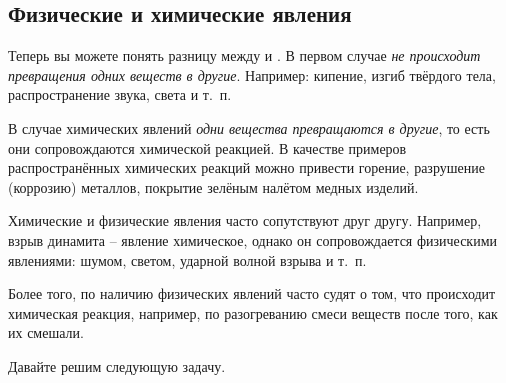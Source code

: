 \subsection*{Физические и химические явления}

Теперь вы можете понять разницу между  и . В первом случае \emph{не происходит превращения одних веществ в другие}. Например: кипение, изгиб твёрдого тела, распространение звука, света и т.~п.

В случае химических явлений \emph{одни вещества превращаются в другие}, то есть они сопровождаются химической реакцией. В качестве примеров распространённых химических реакций можно привести горение, разрушение (коррозию) металлов, покрытие зелёным налётом медных изделий.

Химические и физические явления часто сопутствуют друг другу. Например, взрыв динамита -- явление химическое, однако он сопровождается физическими явлениями: шумом, светом, ударной волной взрыва и т.~п.

Более того, по наличию физических явлений часто судят о том, что происходит химическая реакция, например, по разогреванию смеси веществ после того, как их смешали.

Давайте решим следующую задачу.

